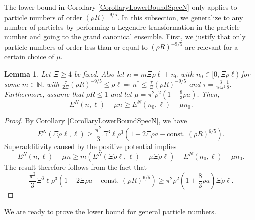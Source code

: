 \documentclass[a4paper,11pt]{article}
\newtheorem{lemma}[theorem]{Lemma}
\numberwithin{equation}{section}
\begin{document}
	The lower bound in Corollary \ref{CorollaryLowerBoundSpecN} only applies to particle numbers of order $ (\rho R)^{-9/5} $. In this subsection, we generalize to any number of particles by performing a Legendre transformation in the particle number and going to the grand canonical ensemble. First, we justify that only particle numbers of order less than or equal to $ (\rho R)^{-9/5} $ are relevant for a certain choice of $ \mu $.
		\begin{lemma}\label{LemmaLocalizationFbound}
			Let $ \Xi\geq 4 $ be fixed. Also let $ n=m\Xi \rho \ell+n_0 $ with $ n_0\in[0,\Xi\rho \ell) $ for some $ m\in\mathbb{N} $, with $\frac{\tau}{2\Xi} (\rho R)^{-9/5} \leq \rho\ell\eqqcolon n^{\ast}\leq \frac{\tau}{\Xi} (\rho R)^{-9/5} $ and $ \tau=\frac{3}{16\pi^2}\frac{1}{8} $. Furthermore, assume that $ \rho R\leq  1 $ and let $ \mu=\pi^2\rho^2\left(1+\frac{8}{3}\rho a\right) $. Then,  \begin{equation}
			E^{N}(n,\ell)-\mu n \geq E^{N}(n_0,\ell)-\mu n_0.
			\end{equation}
		\end{lemma}
		\begin{proof}
			By Corollary \ref{CorollaryLowerBoundSpecN}, we have \begin{equation}
			E^{N}(\Xi\rho\ell,\ell)\geq\frac{\pi^2}{3}\Xi^3\ell\rho^3\left(1+2\Xi\rho a-\text{const. }(\rho R)^{6/5}\right).
			\end{equation}
			Superadditivity caused by the positive potential implies \begin{equation}
			E^N(n,\ell)-\mu n\geq m\left(E^N(\Xi\rho\ell,\ell)-\mu\Xi\rho\ell \right)+E^N(n_0,\ell)-\mu n_0.
			\end{equation}
			The result therefore follows from the fact that \begin{equation}
			\frac{\pi^2}{3}\Xi^3\ell\rho^3\left(1+2\Xi\rho a-\text{const. }(\rho R)^{6/5}\right)\geq \pi^2\rho^2\left(1+\frac{8}{3}\rho a\right) \Xi\rho\ell.
			\end{equation}
		\end{proof}
	We are ready to prove the lower bound for general particle numbers.
\end{document}
